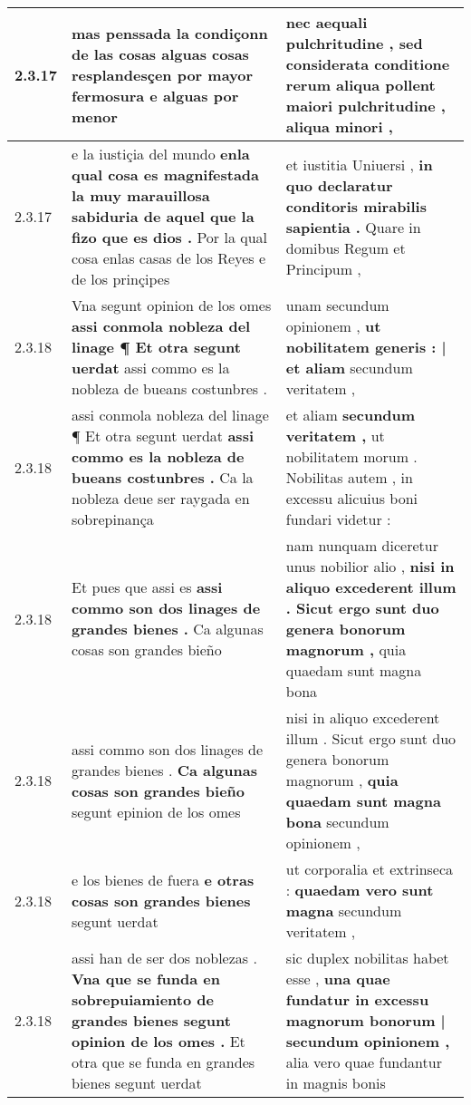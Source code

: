 \begin{tabular}{|p{1cm}|p{6.5cm}|p{6.5cm}|}
2.3.17 & mas penssada la condiçonn de las cosas alguas cosas resplandesçen \textbf{ por mayor fermosura } e alguas por menor & nec aequali pulchritudine , \textbf{ sed considerata conditione rerum aliqua pollent maiori pulchritudine , } aliqua minori , \\\hline
2.3.17 & e la iustiçia del mundo \textbf{ enla qual cosa es magnifestada la muy marauillosa sabiduria de aquel que la fizo que es dios . } Por la qual cosa enlas casas de los Reyes e de los prinçipes & et iustitia Uniuersi , \textbf{ in quo declaratur conditoris mirabilis sapientia . } Quare in domibus Regum et Principum , \\\hline
2.3.18 & Vna segunt opinion de los omes \textbf{ assi conmola nobleza del linage ¶ Et otra segunt uerdat } assi commo es la nobleza de bueans costunbres . & unam secundum opinionem , \textbf{ ut nobilitatem generis : | et aliam } secundum veritatem , \\\hline
2.3.18 & assi conmola nobleza del linage ¶ Et otra segunt uerdat \textbf{ assi commo es la nobleza de bueans costunbres . } Ca la nobleza deue ser raygada en sobrepinança & et aliam \textbf{ secundum veritatem , } ut nobilitatem morum . Nobilitas autem , in excessu alicuius boni fundari videtur : \\\hline
2.3.18 & Et pues que assi es \textbf{ assi commo son dos linages de grandes bienes . } Ca algunas cosas son grandes bieño & nam nunquam diceretur unus nobilior alio , \textbf{ nisi in aliquo excederent illum . Sicut ergo sunt duo genera bonorum magnorum , } quia quaedam sunt magna bona \\\hline
2.3.18 & assi commo son dos linages de grandes bienes . \textbf{ Ca algunas cosas son grandes bieño } segunt epinion de los omes & nisi in aliquo excederent illum . Sicut ergo sunt duo genera bonorum magnorum , \textbf{ quia quaedam sunt magna bona } secundum opinionem , \\\hline
2.3.18 & e los bienes de fuera \textbf{ e otras cosas son grandes bienes } segunt uerdat & ut corporalia et extrinseca : \textbf{ quaedam vero sunt magna } secundum veritatem , \\\hline
2.3.18 & assi han de ser dos noblezas . \textbf{ Vna que se funda en sobrepuiamiento de grandes bienes segunt opinion de los omes . } Et otra que se funda en grandes bienes segunt uerdat & sic duplex nobilitas habet esse , \textbf{ una quae fundatur in excessu magnorum bonorum | secundum opinionem , } alia vero quae fundantur in magnis bonis \\\hline

\end{tabular}
